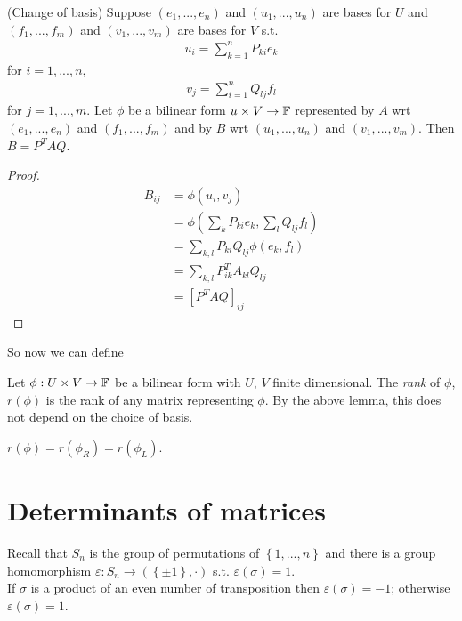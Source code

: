 \documentclass[a4paper]{article}
\begin{document}
\begin{prop} (Change of basis) Suppose $\left(e_1,...,e_n\right)$ and $\left(u_1,...,u_n\right)$ are bases for $U$ and $\left(f_1,...,f_m\right)$ and $\left(v_1,...,v_m\right)$ are bases for $V$ s.t.
\begin{equation*}
\begin{aligned}
u_i = \sum_{k=1}^n P_{ki} e_k
\end{aligned}
\end{equation*}
for $i=1,...,n$,
\begin{equation*}
\begin{aligned}
v_j = \sum_{i=1}^n Q_{lj} f_l
\end{aligned}
\end{equation*}
for $j=1,...,m$. Let $\phi$ be a bilinear form $u \times V \to \mathbb{F}$ represented by $A$ wrt $\left(e_1,...,e_n\right)$ and $\left(f_1,...,f_m\right)$ and by $B$ wrt $\left(u_1,...,u_n\right)$ and $\left(v_1,...,v_m\right)$. Then $B = P^T AQ$.
\begin{proof}
\begin{equation*}
\begin{aligned}
B_{ij} &= \phi\left(u_i,v_j\right)\\
&= \phi\left(\sum_k P_{ki} e_k, \sum_l Q_{lj} f_l\right)\\
&= \sum_{k,l} P_{ki} Q_{lj} \phi\left(e_k,f_l\right)\\
&= \sum_{k,l} P_{ik}^T A_{kl}Q_{lj}\\
&= \left[P^T A Q\right]_{ij}
\end{aligned}
\end{equation*}
\end{proof}
\end{prop}

So now we can define
\begin{defi}
Let $\phi:U \times V \to \mathbb{F}$ be a bilinear form with $U$, $V$ finite dimensional. The \emph{rank} of $\phi$, $r\left(\phi\right)$ is the rank of any matrix representing $\phi$. By the above lemma, this does not depend on the choice of basis.
\end{defi}

\begin{rem}
$r\left(\phi\right) = r\left(\phi_R\right) = r\left(\phi_L\right)$.
\end{rem}

\newpage

\section{Determinants of matrices}
Recall that $S_n$ is the group of permutations of $\left\{1,...,n\right\}$ and there is a group homomorphism $\varepsilon: S_n \to \left(\left\{\pm 1\right\},\cdot\right)$ s.t. $\varepsilon\left(\sigma\right) = 1$.\\
If $\sigma$ is a product of an even number of transposition then $\varepsilon\left(\sigma\right) = -1$; otherwise $\varepsilon\left(\sigma\right) = 1$.
\end{document}
